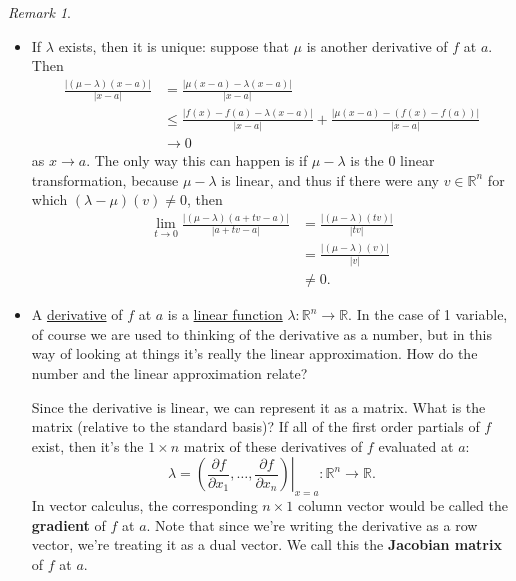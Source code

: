 \documentclass[12pt]{article}
\newcommand{\real}{\mathbb{R}}
\theoremstyle{definition}
\theoremstyle{remark}
\newtheorem*{remark}{Remark}
\begin{document}
\begin{remark}
    \noindent
    \begin{itemize}
        \item If $\lambda$ exists, then it is unique: suppose that $\mu$ is another derivative of $f$ at $a$. Then
        \begin{equation}
            \begin{split}
                \frac{|(\mu - \lambda)(x - a)|}{|x-a|} & = \frac{|\mu(x-a) - \lambda(x-a)|}{|x-a|} \\
                & \leq \frac{|f(x) - f(a) - \lambda(x-a)|}{|x-a|} + \frac{\left|\mu(x-a) - \left( f(x) - f(a) \right) \right|}{|x -a |} \\
                & \to 0
            \end{split}
        \end{equation}
        as $x \to a$. The only way this can happen is if $\mu - \lambda$ is the 0 linear transformation, because $\mu - \lambda$ is linear, and thus if there were any $v \in \real^n$ for which $(\lambda - \mu)(v) \neq 0$, then 
        \begin{equation}
            \begin{split}
                \lim\limits_{t \to 0} \frac{|(\mu - \lambda)(a + tv - a)|}{|a + tv - a|} & = \frac{| (\mu - \lambda)(tv) |}{|tv|} \\
                & = \frac{|(\mu - \lambda)(v)|}{|v|} \\
                & \neq 0.
            \end{split}
        \end{equation}
        \item A \underline{derivative} of $f$ at $a$ is a \underline{linear function} $\lambda : \real^n \to \real$. In the case of 1 variable, of course we are used to thinking of the derivative as a number, but in this way of looking at things it's really the linear approximation. How do the number and the linear approximation relate?
        
        Since the derivative is linear, we can represent it as a matrix. What is the matrix (relative to the standard basis)? If all of the first order partials of $f$ exist, then it's the $1 \times n$ matrix of these derivatives of $f$ evaluated at $a$:
        \begin{equation}
            \lambda = \left. \left( \frac{\partial f}{\partial x_1} , \dotsc , \frac{\partial f}{\partial x_n} \right) \right|_{x = a} : \real^n \to \real.
        \end{equation}
        In vector calculus, the corresponding $n \times 1$ column vector would be called the \textbf{gradient} of $f$ at $a$. Note that since we're writing the derivative as a row vector, we're treating it as a dual vector. We call this the \textbf{Jacobian matrix} of $f$ at $a$.
    \end{itemize}
\end{remark}
\end{document}
